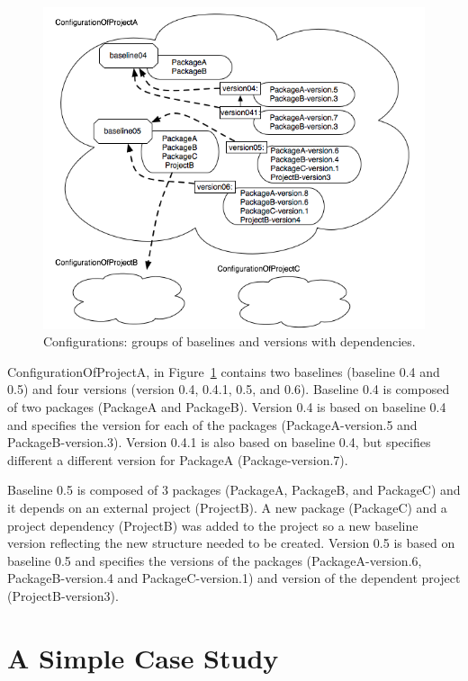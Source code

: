 \documentclass[a4paper,10pt,twoside]{book}
\begin{document}
 
\begin{figure}
\begin{center}
\includegraphics[width=\linewidth]{configurations}
\caption{Configurations: groups of baselines and versions with dependencies.\label{configurations}}
\end{center}
\end{figure} 


ConfigurationOfProjectA, in Figure~\ref{configurations} contains two baselines (baseline 0.4 and 0.5) and four versions (version 0.4, 0.4.1, 0.5, and 0.6). Baseline 0.4 is composed of two packages (PackageA and PackageB). Version 0.4 is based on baseline 0.4 and specifies the version for each of the packages (PackageA-version.5 and PackageB-version.3). Version 0.4.1 is also based on baseline 0.4, but specifies different a different version for PackageA (Package-version.7).

Baseline 0.5 is composed of 3 packages (PackageA, PackageB, and PackageC) and it depends on an external project (ProjectB). A new package (PackageC) and a project dependency (ProjectB) was added to the project so a new baseline version reflecting the new structure needed to be created. Version 0.5 is based on baseline 0.5 and specifies the versions of the packages (PackageA-version.6, PackageB-version.4 and PackageC-version.1) and version of the dependent project (ProjectB-version3).



\section{A Simple Case Study}
\end{document}
